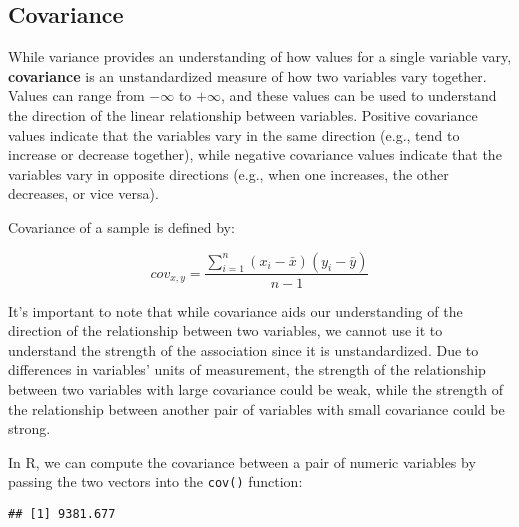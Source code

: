 \documentclass[
]{book}
\newenvironment{Shaded}{\begin{snugshade}}{\end{snugshade}}
\newcommand{\AttributeTok}[1]{\textcolor[rgb]{0.77,0.63,0.00}{#1}}
\newcommand{\CommentTok}[1]{\textcolor[rgb]{0.56,0.35,0.01}{\textit{#1}}}
\newcommand{\FunctionTok}[1]{\textcolor[rgb]{0.00,0.00,0.00}{#1}}
\newcommand{\NormalTok}[1]{#1}
\newcommand{\SpecialCharTok}[1]{\textcolor[rgb]{0.00,0.00,0.00}{#1}}
\newcommand{\StringTok}[1]{\textcolor[rgb]{0.31,0.60,0.02}{#1}}
\begin{document}
\hypertarget{covariance}{%
\subsection{Covariance}\label{covariance}}

While variance provides an understanding of how values for a single variable vary, \textbf{covariance} is an unstandardized measure of how two variables vary together. Values can range from \(-\infty\) to \(+\infty\), and these values can be used to understand the direction of the linear relationship between variables. Positive covariance values indicate that the variables vary in the same direction (e.g., tend to increase or decrease together), while negative covariance values indicate that the variables vary in opposite directions (e.g., when one increases, the other decreases, or vice versa).

Covariance of a sample is defined by:

\[ cov_{x,y} = \frac{\displaystyle\sum_{i=1}^{n} (x_{i}-\bar{x})(y_{i}-\bar{y})}{n-1} \]

It's important to note that while covariance aids our understanding of the direction of the relationship between two variables, we cannot use it to understand the strength of the association since it is unstandardized. Due to differences in variables' units of measurement, the strength of the relationship between two variables with large covariance could be weak, while the strength of the relationship between another pair of variables with small covariance could be strong.

In R, we can compute the covariance between a pair of numeric variables by passing the two vectors into the \texttt{cov()} function:

\begin{Shaded}
\end{Shaded}

\begin{verbatim}
## [1] 9381.677
\end{verbatim}
\end{document}
